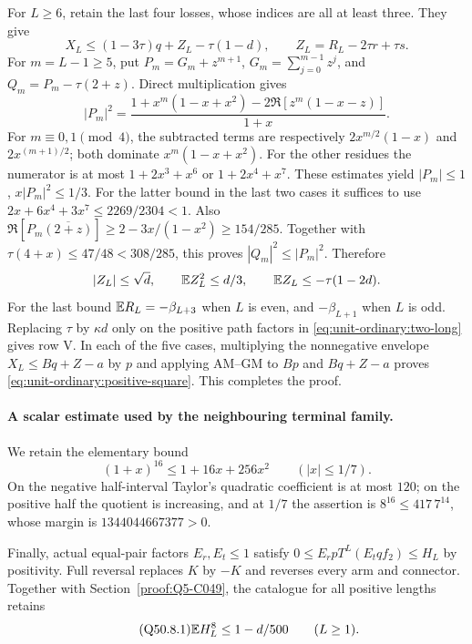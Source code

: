 For \(L\ge6\), retain the last four losses, whose indices are all
at least three. They give
\begin{equation}\label{eq:unit-ordinary:two-long}
 X_L\le(1-3\tau)q+Z_L-\tau(1-d),
 \qquad Z_L=R_L-2\tau r+\tau s.
\end{equation}
For \(m=L-1\ge5\), put
\(P_m=G_m+z^{m+1}\), \(G_m=\sum_{j=0}^{m-1}z^j\), and
\(Q_m=P_m-\tau(2+z)\). Direct multiplication gives
\[
 |P_m|^2=
 \frac{1+x^m(1-x+x^2)-2\Re[z^m(1-x-z)]}{1+x}.
\]
For \(m\equiv0,1\pmod4\), the subtracted terms are respectively
\(2x^{m/2}(1-x)\) and \(2x^{(m+1)/2}\); both dominate
\(x^m(1-x+x^2)\). For the other residues the numerator is at most
\(1+2x^3+x^6\) or \(1+2x^4+x^7\).
These estimates yield \(|P_m|\le1\), \(x|P_m|^2\le1/3\).
For the latter bound in the last two cases it suffices to use
\(2x+6x^4+3x^7\le2269/2304<1\).
Also
\(\Re[P_m\overline{(2+z)}]\ge2-3x/(1-x^2)\ge154/285\).
Together with \(\tau(4+x)\le47/48<308/285\), this proves
\(|Q_m|^2\le|P_m|^2\).
Therefore
\[
 |Z_L|\le\sqrt d,\qquad \mathbb E Z_L^2\le d/3,
 \qquad\mathbb E Z_L\le-\tau(1-2d).
\]
For the last bound \(\mathbb E R_L=-\beta_{L+3}\) when \(L\) is even,
and \(-\beta_{L+1}\) when \(L\) is odd.
Replacing \(\tau\) by \(\kappa d\) only on the positive path
factors in \eqref{eq:unit-ordinary:two-long} gives row V.
In each of the five cases, multiplying the nonnegative envelope
\(X_L\le Bq+Z-a\) by \(p\) and applying AM--GM to
\(Bp\) and \(Bq+Z-a\) proves
\eqref{eq:unit-ordinary:positive-square}. This completes the proof.

\paragraph{A scalar estimate used by the neighbouring terminal family.}
We retain the elementary bound
\begin{equation}\tag{Q50.2.1}\label{eq:Q50:2.1}
 (1+x)^{16}\le1+16x+256x^2\qquad(|x|\le1/7).
\end{equation}
On the negative half-interval Taylor's quadratic coefficient is at most
\(120\); on the positive half the quotient is increasing, and at
\(1/7\) the assertion is \(8^{16}\le417\,7^{14}\), whose margin
is \(1344044667377>0\).

Finally, actual equal-pair factors \(E_r,E_t\le1\) satisfy
\(0\le E_rpT^L(E_tqf_2)\le H_L\) by positivity. Full reversal
replaces \(K\) by \(-K\) and reverses every arm and connector.
Together with Section~\ref{proof:Q5-C049}, the catalogue for all
positive lengths retains
\begin{equation}\tag{Q50.8.1}\label{eq:Q50:8.1}
 \mathbb E H_L^8\le1-d/500\qquad(L\ge1).
\end{equation}
